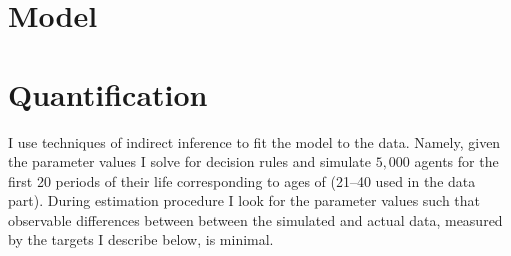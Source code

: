 \documentclass[12pt,letter]{article}
\begin{document}
\section{Model}



\section{Quantification}
I use techniques of indirect inference to fit the model to the data. Namely, given the parameter values I solve for decision rules and simulate $5{,}000$ agents for the first 20 periods of their life corresponding to ages of (21--40 used in the data part). During estimation procedure I look for the parameter values such that observable differences between between the simulated and actual data, measured by the targets I describe below, is minimal.
\end{document}
